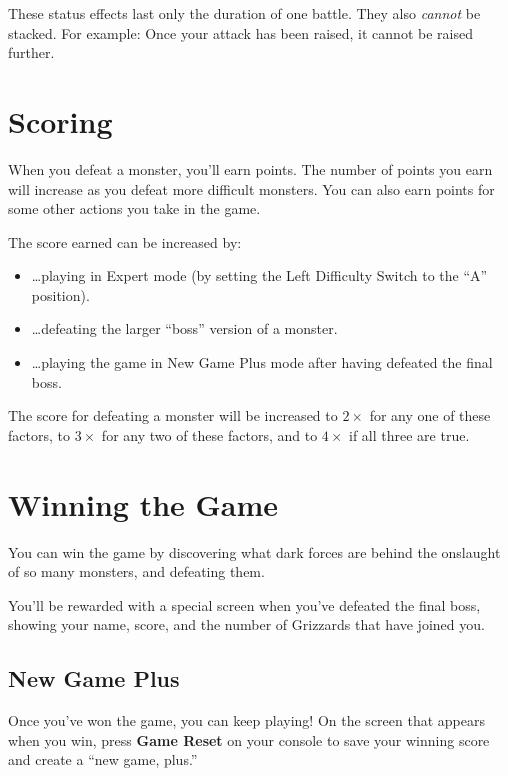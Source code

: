 \documentclass[10pt,twocolumn,openany,article]{memoir}
\begin{document}
These status  effects last only  the duration  of one battle.  They also
\emph{cannot} be stacked. For example: Once your attack has been raised,
it cannot be raised further.

\section{Scoring}

When you defeat a monster, you'll  earn points. The number of points you
earn will increase  as you defeat more difficult monsters.  You can also
earn points for some other actions you take in the game.

The score earned can be increased by:

\begin{itemize}
\item \ldots{}playing  in Expert  mode (by  setting the  Left Difficulty
  Switch to the ``A'' position).
\item \ldots{}defeating the larger ``boss'' version of a monster.
\item  \ldots{}playing the  game  in  New Game  Plus  mode after  having
  defeated the final boss.
\end{itemize}

The score for  defeating a monster will be increased  to $2\times$ for any
one of these  factors, to $3\times$ for  any two of these  factors, and to
$4\times$ if all three are true.

\section{Winning the Game}

You can  win the  game by  discovering what dark  forces are  behind the
onslaught of so many monsters, and defeating them.

You'll  be rewarded  with  a  special screen  when  you've defeated  the
final boss, showing  your name, score, and the number  of Grizzards that
have joined you.

\subsection*{New Game Plus}\label{sec:NewGamePlus}

Once  you've won  the game,  you can  keep playing!  On the  screen that
appears when you win, press \textbf{Game  Reset} on your console to save
your winning score and create a ``new game, plus.''
\end{document}
